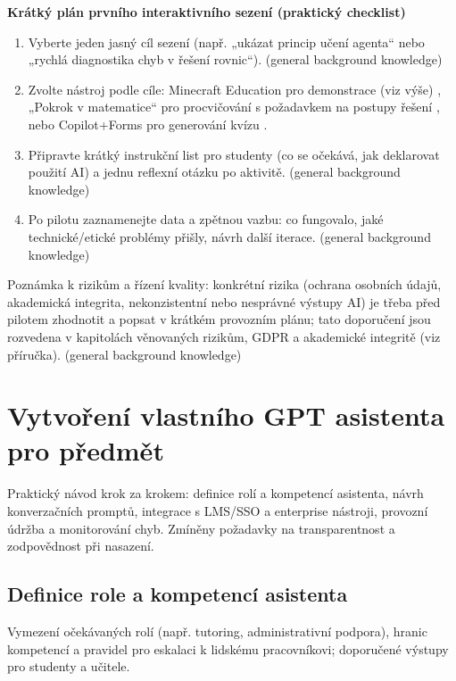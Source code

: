 \documentclass{report}%
\begin{document}
\smallskip
\textbf{Krátký plán prvního interaktivního sezení (praktický checklist)}  
\begin{enumerate}
  \item Vyberte jeden jasný cíl sezení (např. „ukázat princip učení agenta“ nebo „rychlá diagnostika chyb v řešení rovnic“). (general background knowledge)
  \item Zvolte nástroj podle cíle: Minecraft Education pro demonstrace (viz výše) \cite{kb_ai_101_tipu_pdf_04e4a115_page_15_2}, „Pokrok v matematice“ pro procvičování s požadavkem na postupy řešení \cite{kb_ai_101_tipu_pdf_04e4a115_page_8_1}, nebo Copilot+Forms pro generování kvízu \cite{kb_ai_101_tipu_pdf_04e4a115_page_36_1}.
  \item Připravte krátký instrukční list pro studenty (co se očekává, jak deklarovat použití AI) a jednu reflexní otázku po aktivitě. (general background knowledge)
  \item Po pilotu zaznamenejte data a zpětnou vazbu: co fungovalo, jaké technické/etické problémy přišly, návrh další iterace. (general background knowledge)
\end{enumerate}

\smallskip
Poznámka k rizikům a řízení kvality: konkrétní rizika (ochrana osobních údajů, akademická integrita, nekonzistentní nebo nesprávné výstupy AI) je třeba před pilotem zhodnotit a popsat v krátkém provozním plánu; tato doporučení jsou rozvedena v kapitolách věnovaných rizikům, GDPR a akademické integritě (viz příručka). (general background knowledge)%

%
\section{Vytvoření vlastního GPT asistenta pro předmět}%
Praktický návod krok za krokem: definice rolí a kompetencí asistenta, návrh konverzačních promptů, integrace s LMS/SSO a enterprise nástroji, provozní údržba a monitorování chyb. Zmíněny požadavky na transparentnost a zodpovědnost při nasazení.%
\subsection{Definice role a kompetencí asistenta}%
Vymezení očekávaných rolí (např. tutoring, administrativní podpora), hranic kompetencí a pravidel pro eskalaci k lidskému pracovníkovi; doporučené výstupy pro studenty a učitele.%
\end{document}
